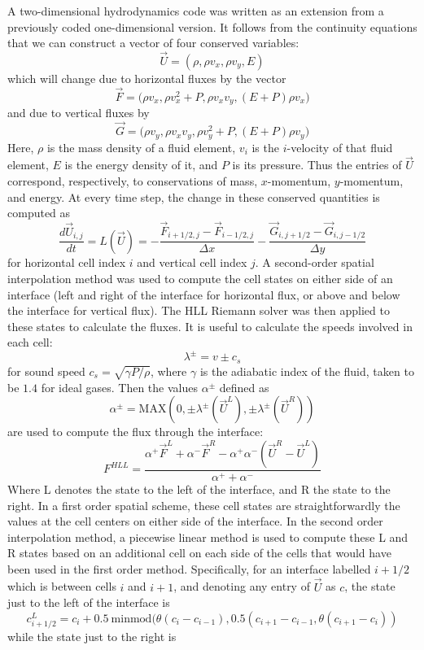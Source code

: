 \documentclass{article}
\begin{document}
A two-dimensional hydrodynamics code was written as an extension from a previously coded one-dimensional version. It follows from the continuity equations that we can construct a vector of four conserved variables: $$ \vec U = (\rho, \rho v_x, \rho v_y, E) $$ which will change due to horizontal fluxes by the vector $$\vec F = \big(\rho v_x, \rho v_x^2+ P, \rho v_x v_y, (E + P) \rho v_x\big)$$ and due to vertical fluxes by $$ \vec G = \big(\rho v_y , \rho v_x v_y, \rho v_y^2 + P, (E + P) \rho v_y \big)$$ Here, $\rho$ is the mass density of a fluid element, $v_i$ is the $i$-velocity of that fluid element, $E$ is the energy density of it, and $P$ is its pressure. Thus the entries of $\vec U$ correspond, respectively, to conservations of mass, $x$-momentum, $y$-momentum, and energy. At every time step, the change in these conserved quantities is computed as 
$$ \frac {d \vec U_{i,j}}{dt} = L(\vec U) = - \frac{\vec F_{i+1/2,j} - \vec F_{i-1/2,j}}{\Delta x} - \frac{\vec G_{i,j+1/2}-\vec G_{i,j-1/2}}{\Delta y}$$ for horizontal cell index $i$ and vertical cell index $j$. A second-order spatial interpolation method was used to compute the cell states on either side of an interface (left and right of the interface for horizontal flux, or above and below the interface for vertical flux). The HLL Riemann solver was then applied to these states to calculate the fluxes. It is useful to calculate the speeds involved in each cell:
$$\lambda^\pm = v \pm c_s$$ for sound speed $c_s = \sqrt{\gamma P/\rho}$, where $\gamma$ is the adiabatic index of the fluid, taken to be $1.4$ for ideal gases. Then  the values $\alpha^\pm$ defined as $$\alpha^\pm = \text{MAX} (0,\pm \lambda^\pm(\vec U^L), \pm \lambda^\pm (\vec U^R))$$ are used to compute the flux through the interface:
$$ F^{HLL} = \frac{\alpha^+ \vec F ^L + \alpha^- \vec F^R - \alpha^+ \alpha^- (\vec U^R - \vec U^L)}{\alpha^+ + \alpha^-}$$ Where L denotes the state to the left of the interface, and R the state to the right. In a first order spatial scheme, these cell states are straightforwardly the values at the cell centers on either side of the interface. In the second order interpolation method, a piecewise linear method is used to compute these L and R states based on an additional cell on each side of the cells that would have been used in the first order method. Specifically, for an interface labelled $i+1/2$ which is between cells $i$ and $i+1$, and denoting any entry of $\vec U$ as $c$, the state just to the left of the interface is 
$$c^L_{i+1/2} = c_i + 0.5 \ \text{minmod}(\theta(c_i - c_{i-1}), 0.5 (c_{i+1} - c_{i-1}, \theta (c_{i+1} - c_i))$$ while the state just to the right is 
\end{document}
